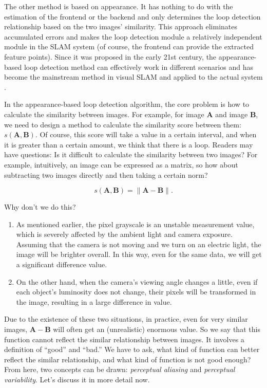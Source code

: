 The other method is based on appearance. It has nothing to do with the estimation of the frontend or the backend and only determines the loop detection relationship based on the two images' similarity. This approach eliminates accumulated errors and makes the loop detection module a relatively independent module in the SLAM system (of course, the frontend can provide the extracted feature points). Since it was proposed in the early 21st century, the appearance-based loop detection method can effectively work in different scenarios and has become the mainstream method in visual SLAM and applied to the actual system {\cite{Ulrich2000, Latif2013, Mur-Artal2015}}.

In the appearance-based loop detection algorithm, the core problem is how to calculate the similarity between images. For example, for image $\mathbf{A}$ and image $\mathbf{B}$, we need to design a method to calculate the similarity score between them: $s(\mathbf{A}, \mathbf{B })$. Of course, this score will take a value in a certain interval, and when it is greater than a certain amount, we think that there is a loop. Readers may have questions: Is it difficult to calculate the similarity between two images? For example, intuitively, an image can be expressed as a matrix, so how about subtracting two images directly and then taking a certain norm?

\begin{equation}
	s(\mathbf{A}, \mathbf{B}) = \| \mathbf{A}-\mathbf{B} \|.
\end{equation}

Why don't we do this?

\begin{enumerate}
	\item As mentioned earlier, the pixel grayscale is an unstable measurement value, which is severely affected by the ambient light and camera exposure. Assuming that the camera is not moving and we turn on an electric light, the image will be brighter overall. In this way, even for the same data, we will get a significant difference value.
	\item On the other hand, when the camera's viewing angle changes a little, even if each object's luminosity does not change, their pixels will be transformed in the image, resulting in a large difference in value.
\end{enumerate}

Due to the existence of these two situations, in practice, even for very similar images, $\mathbf{A}-\mathbf{B}$ will often get an (unrealistic) enormous value. So we say that this function {cannot reflect the similar relationship between images}. It involves a definition of ``good'' and ``bad.'' We have to ask, what kind of function can better reflect the similar relationship, and what kind of function is not good enough? From here, two concepts can be drawn: \textit{perceptual aliasing} and \textit{perceptual variability}. Let's discuss it in more detail now.

